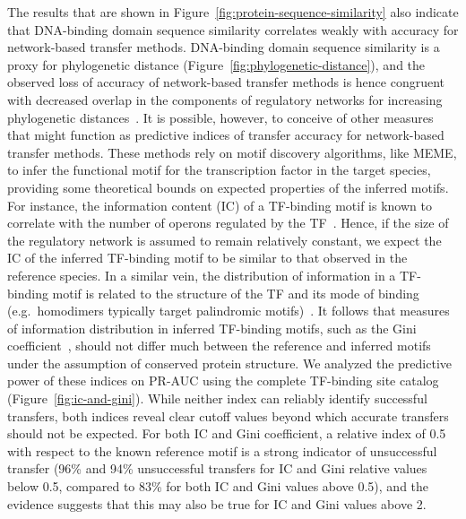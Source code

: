 The results that are shown in Figure~\ref{fig:protein-sequence-similarity} also
indicate that DNA-binding domain sequence similarity correlates weakly with
accuracy for network-based transfer methods. DNA-binding domain sequence
similarity is a proxy for phylogenetic distance
(Figure~\ref{fig:phylogenetic-distance}), and the observed loss of accuracy of
network-based transfer methods is hence congruent with decreased overlap in the
components of regulatory networks for increasing phylogenetic
distances~\cite{venancio2009reconstructing, baumbach2010power,
  price2007orthologous}. It is possible, however, to conceive of other measures
that might function as predictive indices of transfer accuracy for
network-based transfer methods. These methods rely on motif discovery
algorithms, like MEME, to infer the functional motif for the transcription
factor in the target species, providing some theoretical bounds on expected
properties of the inferred motifs. For instance, the information content (IC)
of a TF-binding motif is known to correlate with the number of operons
regulated by the TF~\cite{schneider1986information}. Hence, if the size of the
regulatory network is assumed to remain relatively constant, we expect the IC
of the inferred TF-binding motif to be similar to that observed in the
reference species. In a similar vein, the distribution of information in a
TF-binding motif is related to the structure of the TF and its mode of binding
(e.g.\ homodimers typically target palindromic
motifs)~\cite{ravcheev2014comparative, gelfand1999recognition,
  schneider1996reading}. It follows that measures of information distribution
in inferred TF-binding motifs, such as the Gini
coefficient~\cite{dorfman1979formula}, should not differ much between the
reference and inferred motifs under the assumption of conserved protein
structure. We analyzed the predictive power of these indices on PR-AUC using
the complete TF-binding site catalog (Figure~\ref{fig:ic-and-gini}). While
neither index can reliably identify successful transfers, both indices reveal
clear cutoff values beyond which accurate transfers should not be expected. For
both IC and Gini coefficient, a relative index of 0.5 with respect to the known
reference motif is a strong indicator of unsuccessful transfer (96\% and 94\%
unsuccessful transfers for IC and Gini relative values below 0.5, compared to
83\% for both IC and Gini values above 0.5), and the evidence suggests that
this may also be true for IC and Gini values above 2.

